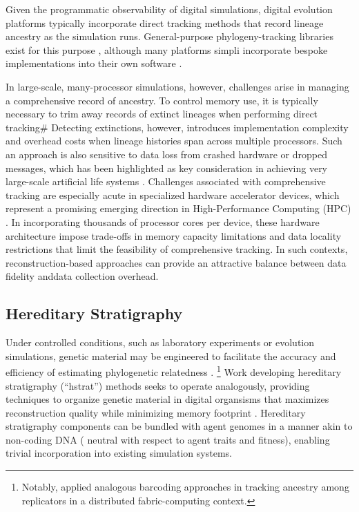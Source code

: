 Given the programmatic observability of digital simulations, digital evolution platforms typically incorporate direct tracking methods that record lineage ancestry as the simulation runs.
General-purpose phylogeny-tracking libraries exist for this purpose \citep{dolson2024phylotrack}, although many platforms simpli incorporate bespoke implementations into their own software \citep{ofria2004avida}.

In large-scale, many-processor simulations, however, challenges arise in managing a comprehensive record of ancestry.
To control memory use, it is typically necessary to trim away records of extinct lineages when performing direct tracking#
Detecting extinctions, however, introduces implementation complexity and overhead costs when lineage histories span across multiple processors.
Such an approach is also sensitive to data loss from crashed hardware or dropped messages, which has been highlighted as key consideration in achieving very large-scale artificial life systems \citep{ackley2016indefinite,ackley2014indefinitely}.
Challenges associated with comprehensive tracking are especially acute in specialized hardware accelerator devices, which represent a promising emerging direction in High-Performance Computing (HPC) \citep{emani2024democratizing}.
In incorporating thousands of processor cores per device, these hardware architecture impose trade-offs in memory capacity limitations and data locality restrictions that limit the feasibility of comprehensive tracking.
In such contexts, reconstruction-based approaches can provide an attractive balance between data fidelity anddata collection overhead.

\subsection{Hereditary Stratigraphy} \label{sec:introduction:hstrat}



Under controlled conditions, such as laboratory experiments or evolution simulations, genetic material may be engineered to facilitate the accuracy and efficiency of estimating phylogenetic relatedness \citep{li2024reconstructing}.%
\footnote{Notably, \citet{ackley2023robust} applied analogous barcoding approaches in tracking ancestry among replicators in a distributed fabric-computing context.}
Work developing hereditary stratigraphy (``hstrat'') methods seeks to operate analogously, providing techniques to organize genetic material in digital organsisms that maximizes reconstruction quality while minimizing memory footprint \citep{moreno2022hereditary}.
Hereditary stratigraphy components can be bundled with agent genomes in a manner akin to non-coding DNA ( neutral with respect to agent traits and fitness), enabling trivial incorporation into existing simulation systems.

